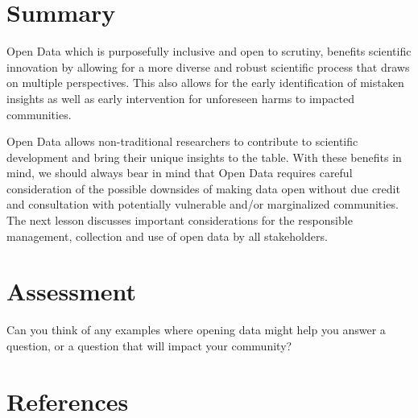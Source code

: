 \documentclass[
  letterpaper,
  DIV=11,
  numbers=noendperiod]{scrreport}
\begin{document}
\hypertarget{summary-10}{%
\section{Summary}\label{summary-10}}

Open Data which is purposefully inclusive and open to scrutiny, benefits
scientific innovation by allowing for a more diverse and robust
scientific process that draws on multiple perspectives. This also allows
for the early identification of mistaken insights as well as early
intervention for unforeseen harms to impacted communities.

Open Data allows non-traditional researchers to contribute to scientific
development and bring their unique insights to the table. With these
benefits in mind, we should always bear in mind that Open Data requires
careful consideration of the possible downsides of making data open
without due credit and consultation with potentially vulnerable and/or
marginalized communities. The next lesson discusses important
considerations for the responsible management, collection and use of
open data by all stakeholders.

\hypertarget{assessment-1}{%
\section{Assessment}\label{assessment-1}}

Can you think of any examples where opening data might help you answer a
question, or a question that will impact your community?

\hypertarget{references-3}{%
\section{References}\label{references-3}}
\end{document}

